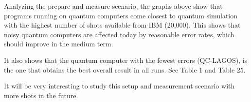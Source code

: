 Analyzing the prepare-and-measure scenario, the graphs above show that programs running on quantum computers come closest to quantum simulation with the highest number of shots available from IBM (20,000). This shows that noisy quantum computers are affected today by reasonable error rates, which should improve in the medium term.

It also shows that the quantum computer with the fewest errors (QC-LAGOS), is the one that obtains the best overall result in all runs. See Table 1 and Table 25.

It will be very interesting to study this setup and measurement scenario with more shots in the future.
